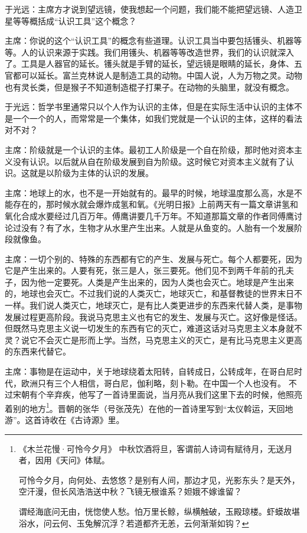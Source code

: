 于光远：主席方才说到望远镜，使我想起一个问题，我们能不能把望远镜、人造卫星等等概括成“认识工具”这个概念？

主席：你说的这个“认识工具”的概念有些道理。认识工具当中要包括镬头、机器等等。人的认识来源于实践。我们用镬头、机器等等改造世界，我们的认识就深入了。工具是人器官的延长。镬头就是手臂的延长，望远镜是眼睛的延长，身体、五官都可以延长。富兰克林说人是制造工具的动物。中国人说，人为万物之灵。动物也有灵长类，但是猴子不知道制造棍子打果子。在动物的头脑里，就没有概念。

于光远：哲学书里通常只以个人作为认识的主体，但是在实际生活中认识的主体不是一个一个的人，而常常是一个集体，如我们党就是一个认识的主体，这样的看法对不对？

主席：阶级就是一个认识的主体。最初工人阶级是一个自在阶级，那时他对资本主义没有认识。以后就从自在阶级发展到自为阶级。这时候它对资本主义就有了认识。这就是以阶级为主体的认识的发展。

主席：地球上的水，也不是一开始就有的。最早的时候，地球温度那么高，水是不能存在的，那时候水就会爆炸成氢和氧。《光明日报》上前两天有一篇文章讲氢和氧化合成水要经过几百万年。傅鹰讲要几千万年。不知道那篇文章的作者同傅鹰讨论过没有？有了水，生物才从水里产生出来。人就是从鱼变的。人胎有一个发展阶段就像鱼。

主席：一切个别的、特殊的东西都有它的产生、发展与死亡。每个人都要死，因为它是产生出来的。人要有死，张三是人，张三要死。他们见不到两千年前的孔夫子，因为他一定要死。人类是产生出来的，因为人类也会灭亡。地球是产生出来的，地球也会灭亡。不过我们说的人类灭亡，地球灭亡，和基督教徒的世界末日不一样。我们说人类灭亡，地球灭亡，是有比人类更进步的东西来代替人类，是事物发展过程更高阶段。我说马克思主义也有它的发生、发展与灭亡。这好像是怪话。但既然马克思主义说一切发生的东西有它的灭亡，难道这话对马克思主义本身就不灵？说它不会灭亡是形而上学。当然，马克思主义的灭亡，是有比马克思主义更高的东西来代替它。

主席：事物是在运动中，关于地球绕着太阳转，自转成日，公转成年，在哥白尼时代，欧洲只有三个人相信，哥白尼，伽利略，刻卜勒。在中国一个人也没有。 不过宋朝有个辛弃疾，他写了一首诗里面说，当月亮从我们这里下去的时候，他照亮着别的地方\footnote{《木兰花慢·可怜今夕月》 中秋饮酒将旦，客谓前人诗词有赋待月，无送月者，因用《天问》体赋。\par 可怜今夕月，向何处、去悠悠？是别有人间，那边才见，光影东头？是天外，空汗漫，但长风浩浩送中秋？飞镜无根谁系？妲娥不嫁谁留？\par 谓经海底问无由，恍惚使人愁。怕万里长鲸，纵横触破，玉殿琼楼。虾蟆故堪浴水，问云何、玉兔解沉浮？若道都齐无恙，云何渐渐如钩？}。晋朝的张华（号张茂先）在他的一首诗里写到“太仪斡运，天回地游”。这首诗收在《古诗源》里。

